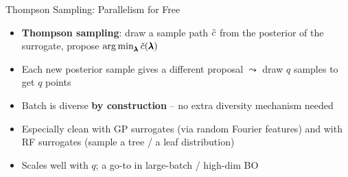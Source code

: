 \documentclass[main]{subfiles}
\begin{document}
\begin{frame}[t]{Thompson Sampling: Parallelism for Free}
  \begin{itemize}
    \item \textbf{Thompson sampling}: draw a sample path $\tilde{c}$ from the posterior of the surrogate, propose $\operatorname*{arg\,min}_{\pmb{\lambda}} \tilde{c}(\pmb{\lambda})$
    \item Each new posterior sample gives a different proposal $\leadsto$ draw $q$ samples to get $q$ points
    \item Batch is diverse \textbf{by construction} -- no extra diversity mechanism needed
    \item Especially clean with GP surrogates (via random Fourier features) and with RF surrogates (sample a tree / a leaf distribution)
    \item Scales well with $q$; a go-to in large-batch / high-dim BO
  \end{itemize}
\end{frame}
\end{document}
